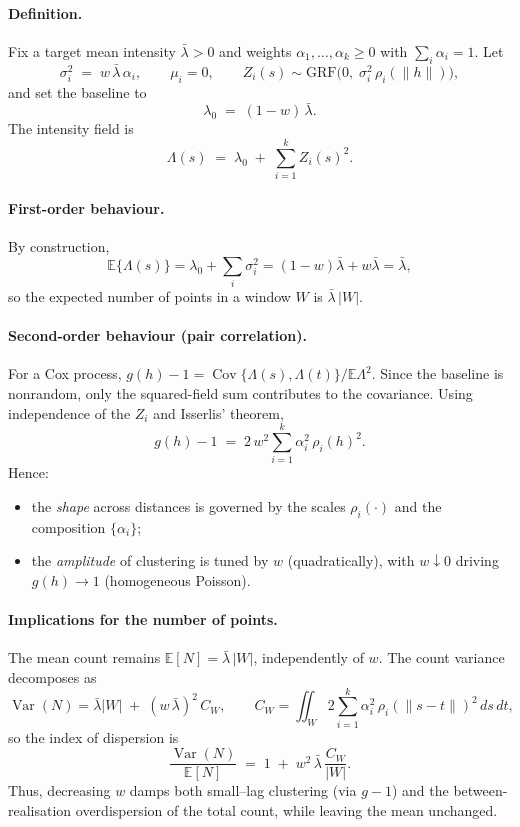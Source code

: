 \documentclass[11pt]{article}
\begin{document}
\paragraph{Definition.}
Fix a target mean intensity $\bar\lambda>0$ and weights
$\alpha_1,\ldots,\alpha_k\ge 0$ with $\sum_i \alpha_i=1$. Let
\[
\sigma_i^2 \;=\; w\,\bar\lambda\,\alpha_i, 
\qquad \mu_i=0, 
\qquad Z_i(s)\sim \text{GRF}\big(0,\;\sigma_i^2\,\rho_i(\|h\|)\big),
\]
and set the baseline to
\[
\lambda_0 \;=\; (1-w)\,\bar\lambda.
\]
The intensity field is
\[
\Lambda(s) \;=\; \lambda_0 \;+\; \sum_{i=1}^k Z_i(s)^2.
\]

\paragraph{First-order behaviour.}
By construction,
\[
\mathbb E\{\Lambda(s)\}=\lambda_0+\sum_i \sigma_i^2
=(1-w)\bar\lambda+w\bar\lambda=\bar\lambda,
\]
so the expected number of points in a window $W$ is $\bar\lambda\,|W|$.

\paragraph{Second-order behaviour (pair correlation).}
For a Cox process, $g(h)-1=\operatorname{Cov}\{\Lambda(s),\Lambda(t)\}/\mathbb E\Lambda^2$.
Since the baseline is nonrandom, only the squared-field sum contributes to the
covariance. Using independence of the $Z_i$ and Isserlis’ theorem,
\[
g(h)-1 \;=\; 2\,w^2 \sum_{i=1}^k \alpha_i^2\,\rho_i(h)^2.
\]
Hence:
\begin{itemize}
	\item the \emph{shape} across distances is governed by the scales $\rho_i(\cdot)$
	and the composition $\{\alpha_i\}$;
	\item the \emph{amplitude} of clustering is tuned by $w$ (quadratically),
	with $w\!\downarrow\!0$ driving $g(h)\!\to\!1$ (homogeneous Poisson).
\end{itemize}

\paragraph{Implications for the number of points.}
The mean count remains $\mathbb E[N]=\bar\lambda\,|W|$, independently of $w$.
The count variance decomposes as
\[
\operatorname{Var}(N)=\bar\lambda|W| \;+\; (w\,\bar\lambda)^2\,C_W,
\qquad
C_W=\iint_W 2\sum_{i=1}^k \alpha_i^2\,\rho_i(\|s-t\|)^2\,ds\,dt,
\]
so the index of dispersion is
\[
\frac{\operatorname{Var}(N)}{\mathbb E[N]}
\;=\; 1 \;+\; w^2\,\bar\lambda\,\frac{C_W}{|W|}.
\]
Thus, decreasing $w$ damps both small–lag clustering (via $g-1$) and the
between-realisation overdispersion of the total count, while leaving the mean
unchanged.
\end{document}
